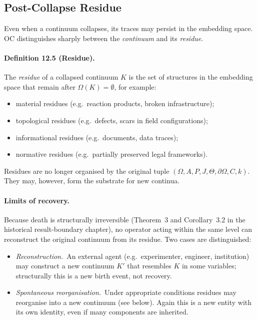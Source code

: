 \subsection{Post-Collapse Residue}

Even when a continuum collapses, its traces may persist in the embedding
space. OC distinguishes sharply between the \emph{continuum} and its
\emph{residue}.

\paragraph{Definition 12.5 (Residue).}
The \emph{residue} of a collapsed continuum \(K\) is the set of structures in
the embedding space that remain after \(\Omega(K)=\emptyset\), for example:
\begin{itemize}
  \item material residues (e.g.\ reaction products, broken infrastructure);
  \item topological residues (e.g.\ defects, scars in field configurations);
  \item informational residues (e.g.\ documents, data traces);
  \item normative residues (e.g.\ partially preserved legal frameworks).
\end{itemize}

Residues are no longer organised by the original tuple
\((\Omega,A,P,J,\Theta,\partial\Omega,C,k)\). They may, however, form the
substrate for new continua.

\paragraph{Limits of recovery.}
Because death is structurally irreversible
(Theorem~3 and Corollary~3.2 in the historical result-boundary chapter), no operator acting
within the same level can reconstruct the original continuum from its
residue. Two cases are distinguished:
\begin{itemize}
  \item \emph{Reconstruction.}\
        An external agent (e.g.\ experimenter, engineer, institution) may
        construct a new continuum \(K'\) that resembles \(K\) in some
        variables; structurally this is a new birth event, not recovery.
  \item \emph{Spontaneous reorganisation.}\
        Under appropriate conditions residues may reorganise into a new
        continuum (see below). Again this is a new entity with its own
        identity, even if many components are inherited.
\end{itemize}


